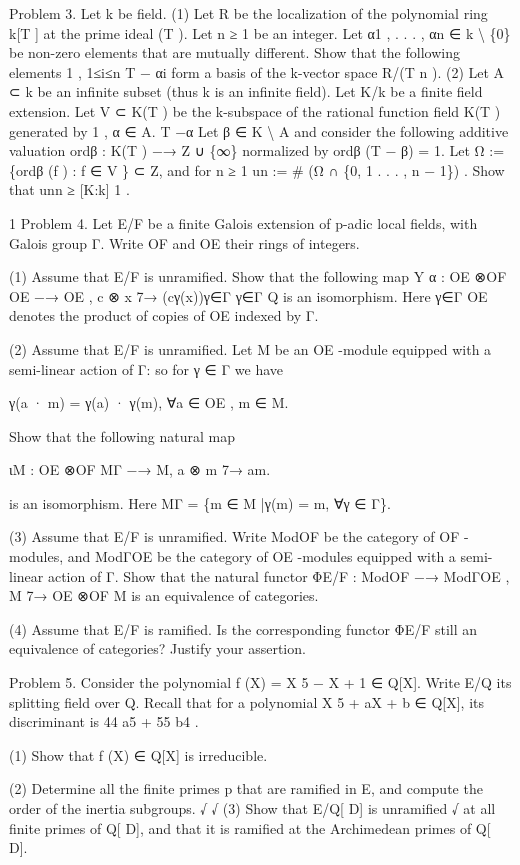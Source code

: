 \documentclass[UTF8,12pt]{ctexart}
\begin{document}
Problem 3. Let k be field. (1) Let R be the localization of the polynomial ring k[T ] at the prime ideal (T ). Let n ≥ 1 be an integer. Let α1 , . . . , αn ∈ k \textbackslash{} \{0\} be non-zero elements that are mutually different. Show that the following elements 1 , 1≤i≤n T − αi form a basis of the k-vector space R/(T n ). (2) Let A ⊂ k be an infinite subset (thus k is an infinite field). Let K/k be a finite field extension. Let V ⊂ K(T ) be the k-subspace of the rational function field K(T ) generated by 1 , α ∈ A. T −α Let β ∈ K \textbackslash{} A and consider the following additive valuation ordβ : K(T ) −→ Z ∪ \{∞\} normalized by ordβ (T − β) = 1. Let Ω := \{ordβ (f ) : f ∈ V \} ⊂ Z, and for n ≥ 1 un := \# (Ω ∩ \{0, 1 . . . , n − 1\}) . Show that unn ≥ [K:k] 1 .

1 Problem 4. Let E/F be a finite Galois extension of p-adic local fields, with Galois group Γ. Write OF and OE their rings of integers.

(1) Assume that E/F is unramified. Show that the following map Y α : OE ⊗OF OE −→ OE , c ⊗ x 7→ (cγ(x))γ∈Γ γ∈Γ Q is an isomorphism. Here γ∈Γ OE denotes the product of copies of OE indexed by Γ.

(2) Assume that E/F is unramified. Let M be an OE -module equipped with a semi-linear action of Γ: so for γ ∈ Γ we have

γ(a · m) = γ(a) · γ(m), ∀a ∈ OE , m ∈ M.

Show that the following natural map

ιM : OE ⊗OF MΓ −→ M, a ⊗ m 7→ am.

is an isomorphism. Here MΓ = \{m ∈ M |γ(m) = m, ∀γ ∈ Γ\}.

(3) Assume that E/F is unramified. Write ModOF be the category of OF -modules, and ModΓOE be the category of OE -modules equipped with a semi-linear action of Γ. Show that the natural functor ΦE/F : ModOF −→ ModΓOE , M 7→ OE ⊗OF M is an equivalence of categories.

(4) Assume that E/F is ramified. Is the corresponding functor ΦE/F still an equivalence of categories? Justify your assertion.

Problem 5. Consider the polynomial f (X) = X 5 − X + 1 ∈ Q[X]. Write E/Q its splitting field over Q. Recall that for a polynomial X 5 + aX + b ∈ Q[X], its discriminant is 44 a5 + 55 b4 .

(1) Show that f (X) ∈ Q[X] is irreducible.

(2) Determine all the finite primes p that are ramified in E, and compute the order of the inertia subgroups. √ √ (3) Show that E/Q[ D] is unramified √ at all finite primes of Q[ D], and that it is ramified at the Archimedean primes of Q[ D].
\end{document}

